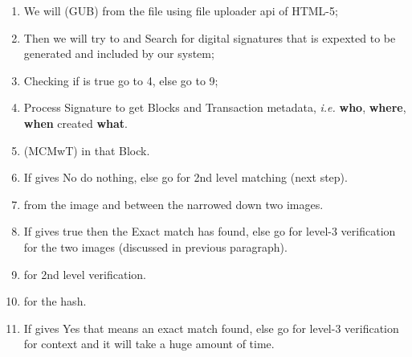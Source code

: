 \begin{enumerate}
\item We will  (GUB) from the file using file uploader api of HTML-5;
\item Then we will try to  and Search for digital signatures that is expexted to be generated and included by our system;
\item Checking if  is true go to 4, else go to 9;
\item Process Signature to get Blocks and Transaction metadata, \textit{i.e.} \textbf{who}, \textbf{where}, \textbf{when} created \textbf{what}.
\item {} (MCMwT) in that Block.
\item If  gives No do nothing, else go for 2nd level matching (next step).
\item {} from the image and  between the narrowed down two images.
\item If  gives true then the Exact match has found, else go for level-3 verification for the two images (discussed in previous paragraph).
\item {} for 2nd level verification.
\item {} for the hash.
\item If  gives Yes that means an exact match found, else go for level-3 verification for context  and it will take a huge amount of time.
\end{enumerate}


